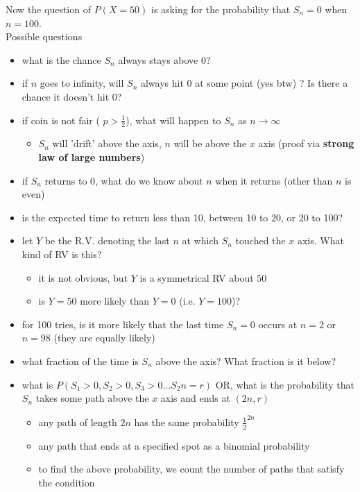 Now the question of $P(X = 50)$ is asking for the probability that $S_n = 0$ when $n = 100$. \\

Possible questions
\begin{itemize}
    \item what is the chance $S_n$ always stays above 0?
    \item if $n$ goes to infinity, will $S_n$ always hit 0 at some point (yes btw) ? Is there a chance it doesn't hit 0?
    \item if coin is not fair ( $p > \frac{1}{2}$), what will happen to $S_n$ as $n \rightarrow \infty$
        \begin{itemize}
           \item $S_n$ will 'drift' above the axis, $n$ will be above the $x$ axis (proof via \textbf{strong law of large numbers})
       \end{itemize}
    \item if $S_n$ returns to $0$, what do we know about $n$ when it returns (other than $n$ is even)
    \item is the expected time to return less than 10, between 10 to 20, or 20 to 100? 
    \item let $Y$ be the R.V. denoting the last $n$ at which $S_n$ touched the $x$ axis. What kind of RV is this?
       \begin{itemize}
          \item it is not obvious, but $Y$ is a symmetrical RV about $50$ 
          \item is $Y = 50$ more likely than $Y = 0$ (i.e. $Y = 100$)? 
       \end{itemize}
    \item for 100 tries, is it more likely that the last time $S_n = 0$  occurs at $n = 2$ or $n = 98$ (they are equally likely)
    \item what fraction of the time is $S_n$ above the axis? What fraction is it below? 
    \item what is $P(S_1 > 0, S_2 > 0, S_3 > 0 \hdots S_2n = r)$ OR, what is the probability that $S_n$ takes some path above the $x$ axis and ends at $(2n, r)$
    \begin{itemize}
       \item any path of length $2n$ has the same probability  $ \frac{1}{2}^{2n}$ 
       \item any path that ends at a specified spot as a binomial probability
       \item to find the above probability, we count the number of paths that satisfy the condition
    \end{itemize}
    
\end{itemize}


